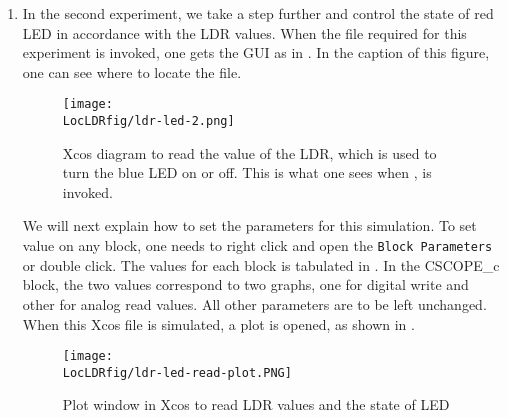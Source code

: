 \begin{enumerate}
        
  \item In the second experiment, we take a step further and control the
        state of red LED in accordance with the LDR values. When the file required for this
        experiment is invoked, one gets the GUI as in .
        In the caption of this figure, one can see where to locate the file.
        
        \begin{figure}
          \centering
          \texttt{[image: \\LocLDRfig/ldr-led-2.png]}
          \caption[Xcos diagram to read the value of the LDR, which is used
            to turn the blue LED on or off] {Xcos diagram to read the value of
            the LDR, which is used to turn the blue LED on or off.  This is
            what one sees when , is
            invoked.}
          \label{fig:ldr-led}
        \end{figure}
        
        We will next explain how to set the parameters for this simulation.
        To set value on any block, one needs to right click and open the
          {\tt Block Parameters} or double click.  The values for each block
        is tabulated in .  In the CSCOPE\_c block, the
        two values correspond to two graphs, one for digital write and other
        for analog read values. All other parameters are to be left
        unchanged. When this Xcos file is simulated, a plot is opened, 
        as shown in . 
        
        \begin{figure}
          \centering
          \texttt{[image: \\LocLDRfig/ldr-led-read-plot.PNG]}
          \caption{Plot window in Xcos to read LDR values and the state of LED}
          \label{fig:ldr-led-read-plot}
        \end{figure}
        

\end{enumerate}
